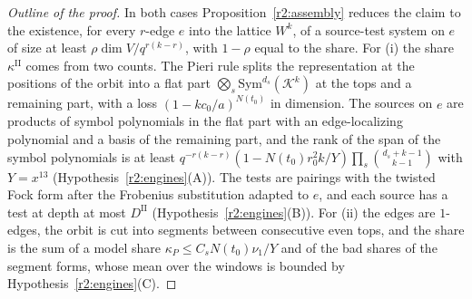 \begin{proof}[Outline of the proof]
In both cases Proposition~\ref{r2:assembly} reduces the claim to the existence, for every $r$-edge $e$ into the lattice $W^k$, of a source-test system on $e$ of size at least $\rho\dim V/q^{r(k-r)}$, with $1-\rho$ equal to the share. For (i) the share $\kappa^{\mathrm{II}}$ comes from two counts. The Pieri rule splits the representation at the positions of the orbit into a flat part $\bigotimes_{s}\mathrm{Sym}^{d_s}(\mathcal K^k)$ at the tops and a remaining part, with a loss $(1-kc_0/a)^{N(t_0)}$ in dimension. The sources on $e$ are products of symbol polynomials in the flat part with an edge-localizing polynomial and a basis of the remaining part, and the rank of the span of the symbol polynomials is at least $q^{-r(k-r)}(1-N(t_0)r_0^2k/Y)\prod_s\binom{d_s+k-1}{k-1}$ with $Y=x^{13}$ (Hypothesis~\ref{r2:engines}(A)). The tests are pairings with the twisted Fock form after the Frobenius substitution adapted to $e$, and each source has a test at depth at most $D^{\mathrm{II}}$ (Hypothesis~\ref{r2:engines}(B)). For (ii) the edges are $1$-edges, the orbit is cut into segments between consecutive even tops, and the share is the sum of a model share $\kappa_P\le C_sN(t_0)\nu_1/Y$ and of the bad shares of the segment forms, whose mean over the windows is bounded by Hypothesis~\ref{r2:engines}(C). 
\end{proof}

